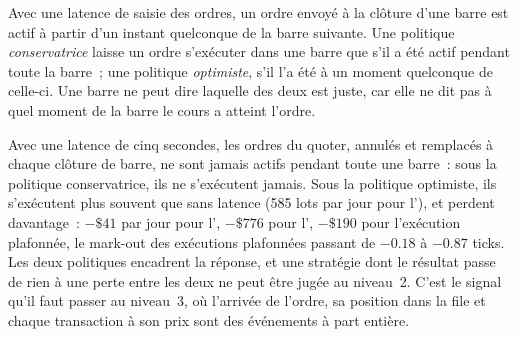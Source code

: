 \begin{definition}\label{def:rs:event-driven-backtests:latency}
Avec une latence de saisie des ordres, un ordre envoyé à la clôture d'une barre est actif à partir d'un instant quelconque de la barre suivante. Une politique \emph{conservatrice} laisse un ordre
s'exécuter dans une barre que s'il a été actif pendant toute la barre~; une politique \emph{optimiste}, s'il l'a été à un moment quelconque de celle-ci. Une barre ne peut dire laquelle des deux est juste,
car elle ne dit pas à quel moment de la barre le cours a atteint l'ordre.
\end{definition}

Avec une latence de cinq secondes, les ordres du quoter, annulés et remplacés à chaque clôture de barre, ne sont jamais actifs pendant toute une barre~: sous la
politique conservatrice, ils ne s'exécutent jamais. Sous la politique optimiste, ils s'exécutent plus souvent que sans latence (585 lots par jour pour l'), et
perdent davantage~: $-\$41$ par jour pour l', $-\$776$ pour l', $-\$190$ pour l'exécution plafonnée, le mark-out des exécutions plafonnées passant
de $-0.18$ à $-0.87$ ticks. Les deux politiques encadrent la réponse, et une stratégie dont le résultat passe de rien à une perte entre les deux ne peut être
jugée au niveau~2. C'est le signal qu'il faut passer au niveau~3, où l'arrivée de l'ordre, sa position dans la file et chaque transaction à son prix sont des événements
à part entière.


